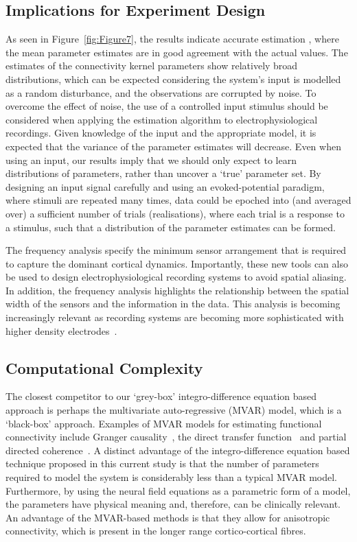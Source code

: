 \documentclass[12pt]{iopart}
\begin{document}
\subsection{Implications for Experiment Design}
As seen in Figure~\ref{fig:Figure7}, the results indicate accurate estimation , where the mean parameter estimates are in good agreement with the actual values. The estimates of the connectivity kernel parameters show relatively broad distributions, which can be expected considering the system's input is modelled as a random disturbance, and the observations are corrupted by noise. To overcome the effect of noise, the use of a controlled input stimulus should be considered when applying the estimation algorithm to electrophysiological recordings. Given knowledge of the input and the appropriate model, it is expected that the variance of the parameter estimates will decrease. Even when using an input, our results imply that we should only expect to learn distributions of parameters, rather than uncover a `true' parameter set. By designing an input signal carefully and using an evoked-potential paradigm, where stimuli are repeated many times, data could be epoched into (and averaged over) a sufficient number of trials (realisations), where each trial is a response to a stimulus, such that a distribution of the parameter estimates can be formed.

The frequency analysis specify the minimum sensor arrangement that is required to capture the dominant cortical dynamics. Importantly, these new tools can also be used to design electrophysiological recording systems to avoid spatial aliasing. In addition, the frequency analysis highlights the relationship between the spatial width of the sensors and the information in the data. This analysis is becoming increasingly relevant as recording systems are becoming more sophisticated with higher density electrodes~\cite{Brinkmann2009}.

\subsection{Computational Complexity}
The closest competitor to our `grey-box' integro-difference equation based approach is perhaps the multivariate auto-regressive (MVAR) model, which is a `black-box' approach. Examples of MVAR models for estimating functional connectivity include Granger causality~\cite{Hesse2003}, the direct transfer function~\cite{Kaminski1991} and partial directed coherence~\cite{Sameshima1999}. A distinct advantage of the integro-difference equation based technique proposed in this current study is that the number of parameters required to model the system is considerably less than a typical MVAR model. Furthermore, by using the neural field equations as a parametric form of a model, the parameters have physical meaning and, therefore, can be clinically relevant. An advantage of the MVAR-based methods is that they allow for anisotropic connectivity, which is present in the longer range cortico-cortical fibres. 
\end{document}
